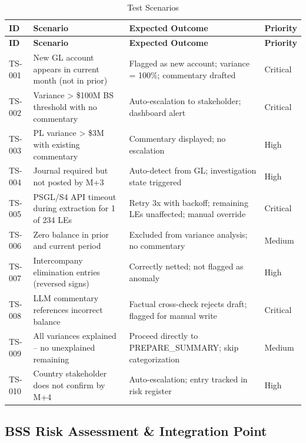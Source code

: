 \documentclass[11pt,a4paper]{article}
\begin{document}
\begin{longtable}{@{}C{1.2cm}L{4cm}L{6cm}C{1.5cm}@{}}
\caption{Test Scenarios} \\
\toprule
\textbf{ID} & \textbf{Scenario} & \textbf{Expected Outcome} & \textbf{Priority} \\
\midrule
\endfirsthead
\toprule
\textbf{ID} & \textbf{Scenario} & \textbf{Expected Outcome} & \textbf{Priority} \\
\midrule
\endhead
TS-001 & New GL account appears in current month (not in prior) & Flagged as new account; variance = 100\%; commentary drafted & \textcolor{critred}{Critical} \\
TS-002 & Variance > \$100M BS threshold with no commentary & Auto-escalation to stakeholder; dashboard alert & \textcolor{critred}{Critical} \\
TS-003 & PL variance > \$3M with existing commentary & Commentary displayed; no escalation & \textcolor{sapgold}{High} \\
TS-004 & Journal required but not posted by M+3 & Auto-detect from GL; investigation state triggered & \textcolor{sapgold}{High} \\
TS-005 & PSGL/S4 API timeout during extraction for 1 of 234 LEs & Retry 3x with backoff; remaining LEs unaffected; manual override & \textcolor{critred}{Critical} \\
TS-006 & Zero balance in prior and current period & Excluded from variance analysis; no commentary & \textcolor{sapblue}{Medium} \\
TS-007 & Intercompany elimination entries (reversed signs) & Correctly netted; not flagged as anomaly & \textcolor{sapgold}{High} \\
TS-008 & LLM commentary references incorrect balance & Factual cross-check rejects draft; flagged for manual write & \textcolor{critred}{Critical} \\
TS-009 & All variances explained -- no unexplained remaining & Proceed directly to PREPARE\_SUMMARY; skip categorization & \textcolor{sapblue}{Medium} \\
TS-010 & Country stakeholder does not confirm by M+4 & Auto-escalation; entry tracked in risk register & \textcolor{sapgold}{High} \\
\bottomrule
\end{longtable}

\subsection{BSS Risk Assessment \& Integration Point}
\end{document}
